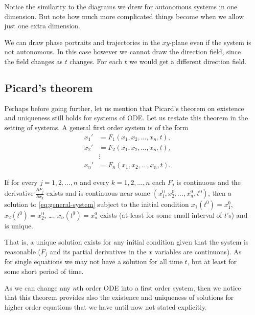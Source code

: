 Notice the similarity to the diagrams we drew for autonomous systems in one
dimension.  But note how much more complicated things become when we
allow just one extra dimension.

We can draw phase portraits and trajectories in the $xy$-plane
even if the system is not autonomous.  In this case however we cannot draw
the direction field, since the field changes as $t$ changes.  For
each $t$ we would get a different direction field.

\subsection{Picard's theorem}

Perhaps before going further, let us mention that Picard's theorem on
existence and uniqueness still holds for systems of ODE\@.  Let us restate
this theorem in the setting of systems.  A general first order
system is of the form
\begin{equation} \label{eq:general-system}
\begin{aligned}
x_1' & = F_1(x_1,x_2,\ldots,x_n,t) , \\
x_2' & = F_2(x_1,x_2,\ldots,x_n,t) , \\
& \vdots \\
x_n' & = F_n(x_1,x_2,\ldots,x_n,t) .
\end{aligned}
\end{equation}

\begin{theorem}%
\label{sys:picardthm}%
If for every $j=1,2,\ldots,n$ and every
$k = 1,2,\ldots,n$
each $F_j$ is continuous
and the derivative
$\frac{\partial F_j}{\partial x_k}$ exists and is
continuous near some $(x_1^0,x_2^0,\ldots,x_n^0,t^0)$, then a solution to
\eqref{eq:general-system}
subject to the initial condition
$x_1(t^0) = x_1^0$,
$x_2(t^0) = x_2^0$, \ldots,
$x_n(t^0) = x_n^0$
exists (at least for some small interval of $t$'s) and is unique.
\end{theorem}

That is, a unique solution exists for any initial condition
given that the system is reasonable ($F_j$ and its partial derivatives
in the $x$ variables are continuous).  As for single equations
we may not have a solution for all time $t$, but at least for some 
short period of time.

As we can change any $n$th order ODE into a first order system,
then we notice that this theorem provides also the
existence and uniqueness of solutions for higher order equations
that we have until now not stated explicitly.


